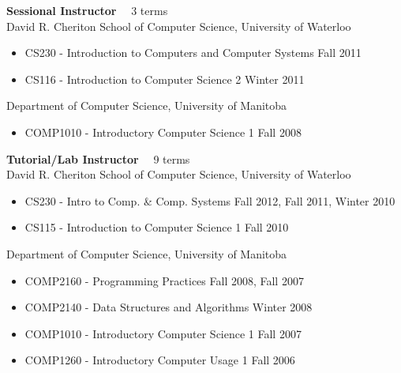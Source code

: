 \documentclass[line,margin]{res}
\begin{document}
\begin{resume}
{\bf Sessional Instructor} ~~3 terms \vspace{4pt} \\
David R. Cheriton School of Computer Science, University of Waterloo
\begin{itemize}  \itemsep -2pt
  \item CS230 - Introduction to Computers and Computer Systems \hfill Fall 2011
  \item CS116 - Introduction to Computer Science 2 \hfill Winter 2011
\end{itemize} \vspace{-4pt}
Department of Computer Science, University of Manitoba
\begin{itemize}  \itemsep -2pt
  \item COMP1010 - Introductory Computer Science 1 \hfill Fall 2008
\end{itemize}

{\bf Tutorial/Lab Instructor} ~~9 terms \vspace{4pt} \\
David R. Cheriton School of Computer Science, University of Waterloo
\begin{itemize}  \itemsep -2pt
  \item CS230 - Intro to Comp. \& Comp. Systems \hfill Fall 2012, Fall 2011, Winter 2010
  \item CS115 - Introduction to Computer Science 1 \hfill Fall 2010
\end{itemize} \vspace{-4pt}
Department of Computer Science, University of Manitoba
\begin{itemize}  \itemsep -2pt
  \item COMP2160 - Programming Practices \hfill Fall 2008, Fall 2007
  \item COMP2140 - Data Structures and Algorithms \hfill Winter 2008
  \item COMP1010 - Introductory Computer Science 1 \hfill Fall 2007
  \item COMP1260 - Introductory Computer Usage 1 \hfill Fall 2006
\end{itemize}


\end{resume}
\end{document}
